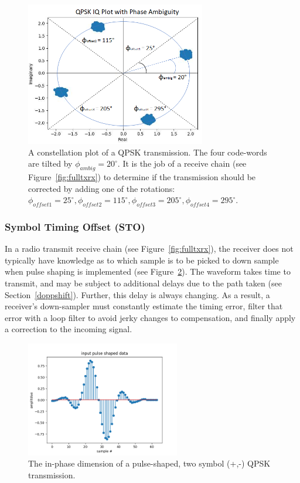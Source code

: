 \FloatBarrier
\begin{figure}[ht!]
	\centering	\includegraphics[width=0.7\textwidth,keepaspectratio]{figs/ambig.png}
    \caption{A constellation plot of a QPSK transmission. The four code-words are tilted by $\phi_{ambig} = 20^{\circ}$. It is the job of a receive chain (see Figure~\ref{fig:fulltxrx}) to determine if the transmission should be corrected by adding one of the rotations: $\phi_{offset1} = 25^{\circ}, \phi_{offset2} = 115^{\circ}, \phi_{offset3} = 205^{\circ}, \phi_{offset4} = 295^{\circ}$.} 
\label{fig:ambig}      
\end{figure}
\FloatBarrier

\subsubsection{Symbol Timing Offset (STO)}
\label{sto}
In a radio transmit receive chain (see Figure~\ref{fig:fulltxrx}), the receiver does not typically have knowledge as to which sample is to be picked to down sample when pulse shaping is implemented (see Figure~\ref{fig:stoin}). The waveform takes time to transmit, and may be subject to additional delays due to the path taken (see Section~\ref{doppshift}). Further, this delay is always changing. As a result, a receiver's down-sampler must constantly estimate the timing error, filter that error with a loop filter to avoid jerky changes to compensation, and finally apply a correction to the incoming signal.

\FloatBarrier
\begin{figure}[ht!]
	\centering	\includegraphics[width=0.6\textwidth,keepaspectratio]{figs/email_ps.png}
    \caption{The in-phase dimension of a pulse-shaped, two symbol (+,-) QPSK transmission.} 
\label{fig:stoin}      
\end{figure}
\FloatBarrier

